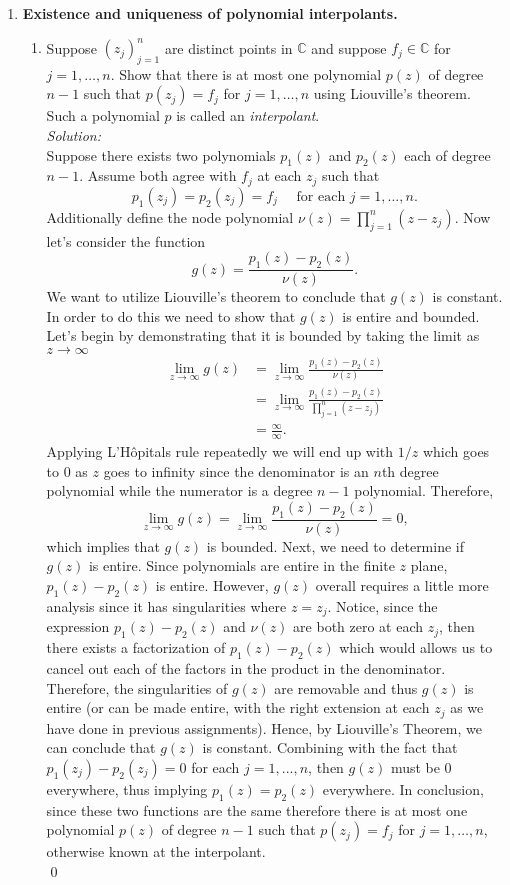 \documentclass[10pt]{amsart}
\theoremstyle{nonumberplain}
\begin{document}
\begin{enumerate}[label={\bf {\arabic*}:}]
\newpage


\item  \textbf{Existence and uniqueness of polynomial interpolants.}
\begin{enumerate}
\item Suppose $(z_j)_{j = 1}^n$ are distinct points in $\mathbb C$ and suppose $f_j \in \mathbb C$ for $j = 1,\ldots,n$.
Show that there is at most one polynomial $p(z)$ of degree $n-1$ such that $p(z_j) = f_j$ for $j = 1,\ldots,n$ using Liouville's theorem.
Such a polynomial $p$ is called an \emph{interpolant}. \\

\noindent
\textit{Solution:} \\
Suppose there exists two polynomials $p_1(z)$ and $p_2(z)$ each of degree $n - 1$.
Assume both agree with $f_j$ at each $z_j$ such that
$$
p_1(z_j) = p_2(z_j) = f_j \quad \text{ for each } j = 1, ..., n.
$$
Additionally define the node polynomial $\nu (z) = \prod_{j=1}^n (z - z_j)$.
Now let's consider the function
$$
g(z) = \frac {p_1(z) - p_2(z)}{\nu(z)}.
$$
We want to utilize Liouville's theorem to conclude that $g(z)$ is constant.
In order to do this we need to show that $g(z)$ is entire and bounded.
Let's begin by demonstrating that it is bounded by taking the limit as $z\rightarrow\infty$
\begin{align*}
\lim_{z\rightarrow\infty}g(z) 
	&= \lim_{z\rightarrow\infty}\frac {p_1(z) - p_2(z)}{\nu(z)} \\
	&= \lim_{z\rightarrow\infty}\frac {p_1(z) - p_2(z)}{\prod_{j=1}^n (z - z_j)} \\
	&= \frac \infty \infty.
\end{align*}
Applying L'Hôpitals rule repeatedly we will end up with $1/z$ which goes to 0 as $z$ goes to infinity since the denominator is an $n$th degree polynomial while the numerator is a degree $n - 1$ polynomial.
Therefore,
$$
\lim_{z\rightarrow\infty}g(z) = \lim_{z\rightarrow\infty}\frac {p_1(z) - p_2(z)}{\nu(z)} = 0,
$$
which implies that $g(z)$ is bounded.
Next, we need to determine if $g(z)$ is entire.
Since polynomials are entire in the finite $z$ plane, $p_1(z) - p_2(z)$ is entire.
However, $g(z)$ overall requires a little more analysis since it has singularities where $z=z_j$.
Notice, since the expression $p_1(z) - p_2(z)$ and $\nu(z)$ are both zero at each $z_j$, then there exists a factorization of $p_1(z) - p_2(z)$ which would allows us to cancel out each of the factors in the product in the denominator.
Therefore, the singularities of $g(z)$ are removable and thus $g(z)$ is entire (or can be made entire, with the right extension at each $z_j$ as we have done in previous assignments).
Hence, by Liouville's Theorem, we can conclude that $g(z)$ is constant.
Combining with the fact that $p_1(z_j) - p_2(z_j) = 0$ for each $j = 1, ..., n$, then $g(z)$ must be 0 everywhere, thus implying $p_1(z) = p_2(z)$ everywhere.
In conclusion, since these two functions are the same therefore there is at most one polynomial $p(z)$ of degree $n - 1$ such that $p(z_j) = f_j$ for $j = 1,\ldots,n$, otherwise known at the interpolant. \\
\qed \\


\end{enumerate}
\end{enumerate}
\end{document}
